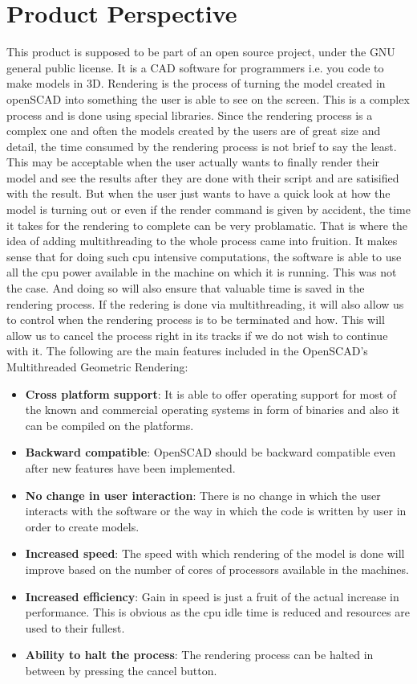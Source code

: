 \section{Product Perspective}
This product is supposed to be part of an open source project, under the GNU general public license. It is a CAD software for programmers i.e. you code to make models in 3D. Rendering is the process of turning the model created in openSCAD into something the user is able to see on the screen. This is a complex process and is done using special libraries. Since the rendering process is a complex one and often the models created by the users are of great size and detail, the time consumed by the rendering process is not brief to say the least.
This may be acceptable when the user actually wants to finally render their model and see the results after they are done with their script and are satisified with the result. But when the user just wants to have a quick look at how the model is turning out or even if the render command is given by accident, the time it takes for the rendering to complete can be very problamatic.
That is where the idea of adding multithreading to the whole process came into fruition. It makes sense that for doing such cpu intensive computations, the software is able to use all the cpu power available in the machine on which it is running. This was not the case. And doing so will also ensure that valuable time is saved in the rendering process. If the redering is done via multithreading, it will also allow us to control when the rendering process is to be terminated and how. This will allow us to cancel the process right in its tracks if we do not wish to continue with it.
The following are the main features included in the OpenSCAD's Multithreaded Geometric Rendering:
\begin{itemize}
	\item \textbf{Cross platform support}: It is able to offer operating support for most of the known and commercial operating systems in form of binaries and also it can be compiled on the platforms.
	\item \textbf{Backward compatible}: OpenSCAD should be backward compatible even after new features have been implemented.
	\item \textbf{No change in user interaction}: There is no change in which the user interacts with the software or the way in which the code is written by user in order to create models.
	\item \textbf{Increased speed}: The speed with which rendering of the model is done will improve based on the number of cores of processors available in the machines.
	\item \textbf{Increased efficiency}: Gain in speed is just a fruit of the actual increase in performance. This is obvious as the cpu idle time is reduced and resources are used to their fullest.
	\item \textbf{Ability to halt the process}: The rendering process can be halted in between by pressing the cancel button.
\end{itemize}
